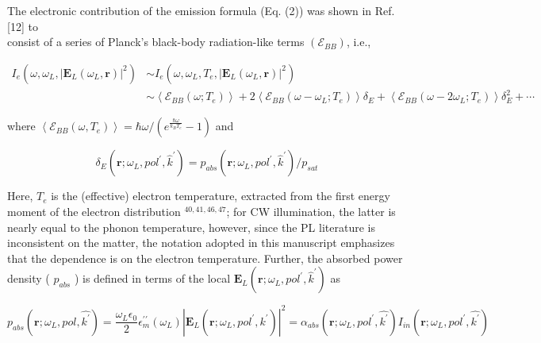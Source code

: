 \documentclass[10pt]{article}
\begin{document}
The electronic contribution of the emission formula (Eq. (2)) was shown in Ref. [12] to\\
consist of a series of Planck's black-body radiation-like terms $\left(\mathcal{E}_{B B}\right)$, i.e.,


\begin{align*}
I_{e}\left(\omega, \omega_{L},\left|\mathbf{E}_{L}\left(\omega_{L}, \mathbf{r}\right)\right|^{2}\right) & \sim I_{e}\left(\omega, \omega_{L}, T_{e},\left|\mathbf{E}_{L}\left(\omega_{L}, \mathbf{r}\right)\right|^{2}\right)  \tag{4}\\
& \sim\left\langle\mathcal{E}_{B B}\left(\omega ; T_{e}\right)\right\rangle+2\left\langle\mathcal{E}_{B B}\left(\omega-\omega_{L} ; T_{e}\right)\right\rangle \delta_{E}+\left\langle\mathcal{E}_{B B}\left(\omega-2 \omega_{L} ; T_{e}\right)\right\rangle \delta_{E}^{2}+\cdots
\end{align*}


where $\left\langle\mathcal{E}_{B B}\left(\omega, T_{e}\right)\right\rangle=\hbar \omega /\left(e^{\frac{\hbar \omega}{k_{B} T_{e}}}-1\right)$ and


\begin{equation*}
\delta_{E}\left(\mathbf{r} ; \omega_{L}, p o l^{\prime}, \hat{k}^{\prime}\right)=p_{a b s}\left(\mathbf{r} ; \omega_{L}, p o l^{\prime}, \hat{k}^{\prime}\right) / p_{s a t} \tag{5}
\end{equation*}


Here, $T_{e}$ is the (effective) electron temperature, extracted from the first energy moment of the electron distribution ${ }^{40,41,46,47}$; for CW illumination, the latter is nearly equal to the phonon temperature, however, since the PL literature is inconsistent on the matter, the notation adopted in this manuscript emphasizes that the dependence is on the electron temperature. Further, the absorbed power density ( $p_{a b s}$ ) is defined in terms of the local $\mathbf{E}_{L}\left(\mathbf{r} ; \omega_{L}, p o l^{\prime}, \hat{k}^{\prime}\right)$ as


\begin{equation*}
p_{a b s}\left(\mathbf{r} ; \omega_{L}, p o l, \hat{k^{\prime}}\right)=\frac{\omega_{L} \epsilon_{0}}{2} \epsilon_{m}^{\prime \prime}\left(\omega_{L}\right)\left|\mathbf{E}_{L}\left(\mathbf{r} ; \omega_{L}, p o l^{\prime}, \hat{k^{\prime}}\right)\right|^{2}=\alpha_{a b s}\left(\mathbf{r} ; \omega_{L}, p o l^{\prime}, \hat{k^{\prime}}\right) I_{i n}\left(\mathbf{r} ; \omega_{L}, p o l^{\prime}, \hat{k^{\prime}}\right) \tag{6}
\end{equation*}
\end{document}
